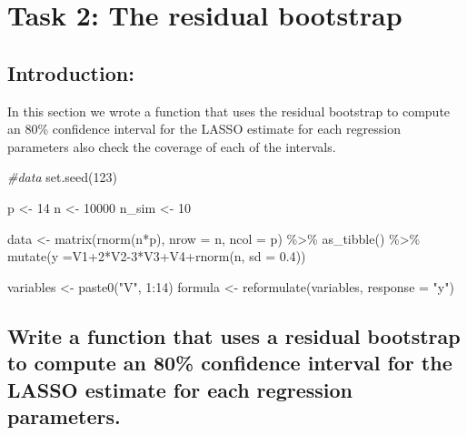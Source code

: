 \documentclass[
]{article}
\newenvironment{Shaded}{\begin{snugshade}}{\end{snugshade}}
\newcommand{\AttributeTok}[1]{\textcolor[rgb]{0.77,0.63,0.00}{#1}}
\newcommand{\CommentTok}[1]{\textcolor[rgb]{0.56,0.35,0.01}{\textit{#1}}}
\newcommand{\DecValTok}[1]{\textcolor[rgb]{0.00,0.00,0.81}{#1}}
\newcommand{\FloatTok}[1]{\textcolor[rgb]{0.00,0.00,0.81}{#1}}
\newcommand{\FunctionTok}[1]{\textcolor[rgb]{0.00,0.00,0.00}{#1}}
\newcommand{\NormalTok}[1]{#1}
\newcommand{\OtherTok}[1]{\textcolor[rgb]{0.56,0.35,0.01}{#1}}
\newcommand{\SpecialCharTok}[1]{\textcolor[rgb]{0.00,0.00,0.00}{#1}}
\newcommand{\StringTok}[1]{\textcolor[rgb]{0.31,0.60,0.02}{#1}}
\begin{document}
\hypertarget{task-2-the-residual-bootstrap}{%
\section{Task 2: The residual
bootstrap}\label{task-2-the-residual-bootstrap}}

\hypertarget{introduction-1}{%
\subsection{Introduction:}\label{introduction-1}}

In this section we wrote a function that uses the residual bootstrap to
compute an 80\% confidence interval for the LASSO estimate for each
regression parameters also check the coverage of each of the intervals.

\begin{Shaded}
\begin{Highlighting}[]
\CommentTok{\#data}
\FunctionTok{set.seed}\NormalTok{(}\DecValTok{123}\NormalTok{)}

\NormalTok{p }\OtherTok{\textless{}{-}} \DecValTok{14}
\NormalTok{n }\OtherTok{\textless{}{-}} \DecValTok{10000}
\NormalTok{n\_sim }\OtherTok{\textless{}{-}} \DecValTok{10}

\NormalTok{data }\OtherTok{\textless{}{-}} \FunctionTok{matrix}\NormalTok{(}\FunctionTok{rnorm}\NormalTok{(n}\SpecialCharTok{*}\NormalTok{p), }\AttributeTok{nrow =}\NormalTok{ n, }\AttributeTok{ncol =}\NormalTok{ p) }\SpecialCharTok{\%\textgreater{}\%} 
  \FunctionTok{as\_tibble}\NormalTok{() }\SpecialCharTok{\%\textgreater{}\%} 
  \FunctionTok{mutate}\NormalTok{(}\AttributeTok{y =}\NormalTok{V1}\SpecialCharTok{+}\DecValTok{2}\SpecialCharTok{*}\NormalTok{V2}\DecValTok{{-}3}\SpecialCharTok{*}\NormalTok{V3}\SpecialCharTok{+}\NormalTok{V4}\SpecialCharTok{+}\FunctionTok{rnorm}\NormalTok{(n, }\AttributeTok{sd =} \FloatTok{0.4}\NormalTok{))}

\NormalTok{variables }\OtherTok{\textless{}{-}} \FunctionTok{paste0}\NormalTok{(}\StringTok{"V"}\NormalTok{, }\DecValTok{1}\SpecialCharTok{:}\DecValTok{14}\NormalTok{)}
\NormalTok{formula }\OtherTok{\textless{}{-}} \FunctionTok{reformulate}\NormalTok{(variables, }\AttributeTok{response =} \StringTok{"y"}\NormalTok{)}
\end{Highlighting}
\end{Shaded}

\hypertarget{write-a-function-that-uses-a-residual-bootstrap-to-compute-an-80-confidence-interval-for-the-lasso-estimate-for-each-regression-parameters.}{%
\subsection{Write a function that uses a residual bootstrap to compute
an 80\% confidence interval for the LASSO estimate for each regression
parameters.}\label{write-a-function-that-uses-a-residual-bootstrap-to-compute-an-80-confidence-interval-for-the-lasso-estimate-for-each-regression-parameters.}}
\end{document}
